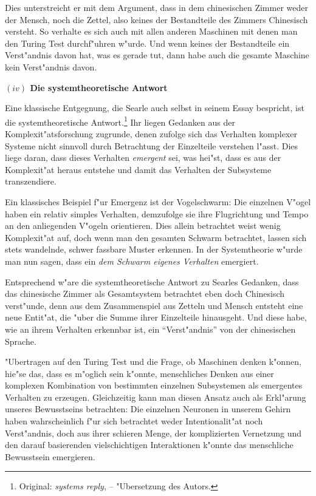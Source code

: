 \documentclass[a4paper, emulatestandardclasses, 12pt]{scrartcl}
\begin{document}
\begin{onehalfspace}
Dies unterstreicht er mit dem Argument, dass in dem chinesischen Zimmer weder der Mensch, noch die Zettel, also keines der Bestandteile des Zimmers Chinesisch versteht. So verhalte es sich auch mit allen anderen Maschinen mit denen man den Turing Test durchf"uhren w"urde. Und wenn keines der Bestandteile ein Verst"andnis davon hat, was es gerade tut, dann habe auch die gesamte Maschine kein Verst"andnis davon.

\vspace{5mm}
\noindent\textbf{$(iv)$ Die systemtheoretische Antwort}

\noindent Eine klassische Entgegnung, die Searle auch selbst in seinem Essay bespricht, ist die systemtheoretische Antwort.\footnote{Original: \emph{systems reply}, \cite[S.419]{searle1980minds} --  "Ubersetzung des Autors.} Ihr liegen Gedanken aus der Komplexit"atsforschung zugrunde, denen zufolge sich das Verhalten komplexer Systeme nicht sinnvoll durch Betrachtung der Einzelteile verstehen l"asst. Dies liege daran, dass dieses Verhalten \emph{emergent} sei, was hei"st, dass es aus der Komplexit"at heraus entstehe und damit das Verhalten der Subsysteme transzendiere. 

Ein klassisches Beispiel f"ur Emergenz ist der Vogelschwarm: Die einzelnen V"ogel haben ein relativ simples Verhalten, demzufolge sie ihre Flugrichtung und Tempo an den anliegenden V"ogeln orientieren. Dies allein betrachtet weist wenig Komplexit"at auf, doch wenn man den gesamten Schwarm betrachtet, lassen sich stets wandelnde, schwer fassbare Muster erkennen. In der Systemtheorie w"urde man nun sagen, dass ein \emph{dem Schwarm eigenes Verhalten} emergiert.

Entsprechend w"are die systemtheoretische Antwort zu Searles Gedanken, dass das chinesische Zimmer als Gesamtsystem betrachtet eben doch Chinesisch verst"unde, denn aus dem Zusammenspiel aus Zetteln und Mensch entsteht eine neue Entit"at, die "uber die Summe ihrer Einzelteile hinausgeht. Und diese habe, wie an ihrem Verhalten erkennbar ist, ein "`Verst"andnis"' von der chinesischen Sprache.

"Ubertragen auf den Turing Test und die Frage, ob Maschinen denken k"onnen, hie"se das, dass es m"oglich sein k"onnte, menschliches Denken aus einer komplexen Kombination von bestimmten einzelnen Subsystemen als emergentes Verhalten zu erzeugen. Gleichzeitig kann man diesen Ansatz auch als Erkl"arung unseres Bewusstseins betrachten: Die einzelnen Neuronen in unserem Gehirn haben wahrscheinlich f"ur sich betrachtet weder Intentionalit"at noch Verst"andnis, doch aus ihrer schieren Menge, der komplizierten Vernetzung und den darauf basierenden vielschichtigen Interaktionen k"onnte das menschliche Bewusstsein emergieren.


\end{onehalfspace}
\end{document}
